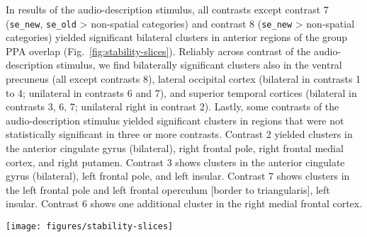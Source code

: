 \documentclass[english]{article}
\begin{document}

In results of the audio-description stimulus, all contrasts except contrast 7
(\texttt{se\_new}, \texttt{se\_old} > non-spatial categories) and contrast 8
(\texttt{se\_new} > non-spatial categories) yielded significant bilateral
clusters in anterior regions of the group PPA overlap (Fig.~\ref{fig:stability-slices}).
Reliably across contrast of the audio-description stimulus, we find bilaterally significant
clusters also in the ventral precuneus (all except contrasts 8), lateral
occipital cortex (bilateral in contrasts 1 to 4; unilateral in contrasts 6 and
7), and superior temporal cortices (bilateral in contrasts 3, 6, 7; unilateral
right in contrast 2).
Lastly, some contrasts of the audio-description stimulus yielded significant clusters in
regions that were not statistically significant in three or more contrasts.
%
Contrast 2 yielded clusters in the anterior cingulate gyrus (bilateral), right
frontal pole, right frontal medial cortex, and right putamen.
%
Contrast 3 shows clusters in the anterior cingulate gyrus (bilateral), left
frontal pole, and left insular.
%
Contrast 7 shows clusters in the left frontal pole and left frontal operculum
[border to triangularis], left insular.
%
Contrast 6 shows one additional cluster in the right medial frontal cortex.


\begin{figure*}[tbp]
\centering
    \texttt{[image: figures/stability-slices]}
    \caption{Overlap of significant clusters ($Z$>3.4; $p$<.05, cluster corrected)
        The audio-description's contrasts 1-8 (blue; \ref{tab:ao-contrasts})
        are overlaid over the audio-visual movie's contrasts 1-5 (red;
        \ref{tab:av-contrasts}).
        Cluster are overlaid on top of the MNI152 T1-weighted head template
        (gray).
        Black: outline of overlapping individual PPA ROIs.
        Light gray: The audio-description's field-of-view (cf.
        \citep{hanke2014audiomovie}).
        The figure shows that some contrasts yielded significant clusters
        also in the lateral temporal and prefrontal cortex.
        }
    \label{fig:stability-slices}
\end{figure*}
\end{document}
